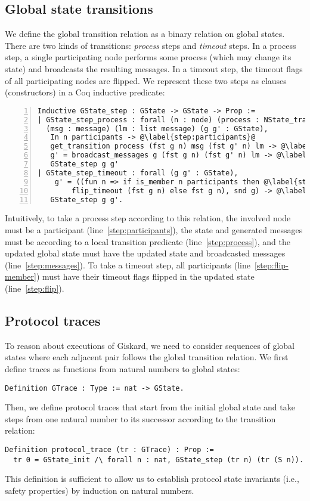 \documentclass{easychair}
\begin{document}
\subsection{Global state transitions}
We define the global transition relation as a binary relation on global states. There are two kinds of transitions: \emph{process} steps and \emph{timeout} steps. In a process step, a single participating node performs some process (which may change its state) and broadcasts the resulting messages. In a timeout step, the timeout flags of all participating nodes are flipped. We represent these two steps as clauses (constructors) in a Coq inductive predicate:
\begin{lstlisting}[language=Coq,numbers=left,numberstyle=\footnotesize,escapechar=@]
Inductive GState_step : GState -> GState -> Prop :=
| GState_step_process : forall (n : node) (process : NState_transition_type)
  (msg : message) (lm : list message) (g g' : GState),
   In n participants -> @\label{step:participants}@
   get_transition process (fst g n) msg (fst g' n) lm -> @\label{step:process}@
   g' = broadcast_messages g (fst g n) (fst g' n) lm -> @\label{step:messages}@
   GState_step g g'
| GState_step_timeout : forall (g g' : GState),
    g' = ((fun n => if is_member n participants then @\label{step:flip-member}@
        flip_timeout (fst g n) else fst g n), snd g) -> @\label{step:flip}@
   GState_step g g'.
\end{lstlisting}
Intuitively, to take a process step according to this relation, the involved node must be a participant (line~\ref{step:participants}), the state and generated messages must be according to a local transition predicate (line~\ref{step:process}), and the updated global state  must have the updated state and broadcasted messages (line~\ref{step:messages}). To take a timeout step, all participants (line~\ref{step:flip-member}) must have their timeout flags flipped in the updated state (line~\ref{step:flip}).

\subsection{Protocol traces}

To reason about executions of Giskard, we need to consider sequences of global states
where each adjacent pair follows the global transition relation. We first define traces as functions from natural numbers to global states:
\begin{lstlisting}[language=Coq]
Definition GTrace : Type := nat -> GState.
\end{lstlisting}
Then, we define protocol traces that start from the initial global state and take steps from one natural number to its successor according to the transition relation:
\begin{lstlisting}[language=Coq]
Definition protocol_trace (tr : GTrace) : Prop :=
  tr 0 = GState_init /\ forall n : nat, GState_step (tr n) (tr (S n)).
\end{lstlisting}
This definition is sufficient to allow us to establish protocol state invariants (i.e., safety properties) by induction on natural numbers.
\end{document}
